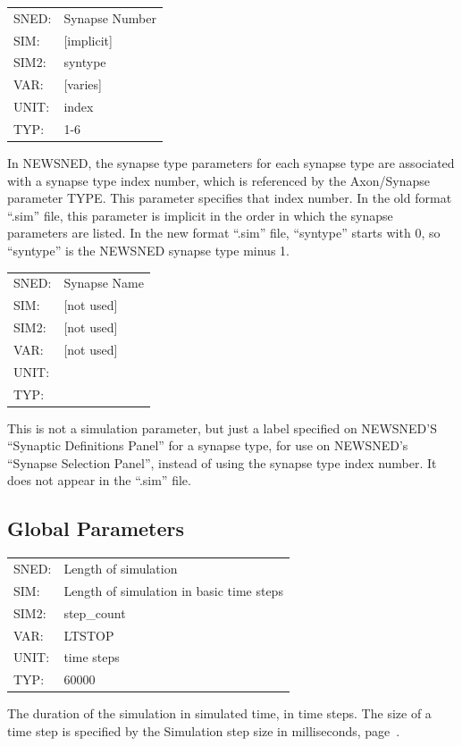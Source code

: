 \documentclass[12pt,openany,oneside]{book}
\newcommand{\tiref}[1]{#1, page~\pageref{#1}}
\begin{document}
\begin{flushleft}
\begin{tabular}{@{}ll@{}}
SNED: & Synapse Number\\
SIM: & [implicit]\\
SIM2: & syntype\\
VAR: & [varies]\\
UNIT: & index\\
TYP: & 1-6\\
\end{tabular}
\end{flushleft}
\noindent
In NEWSNED, the synapse type parameters for each synapse type are
associated with a synapse type index number, which is referenced by
the Axon/Synapse parameter TYPE.  This parameter specifies that index
number.  In the old format ``.sim'' file, this parameter is implicit
in the order in which the synapse parameters are listed.  In the new
format ``.sim'' file, ``syntype'' starts with 0, so ``syntype'' is the
NEWSNED synapse type minus 1.
\filbreak
\vspace{\baselineskip}

\begin{flushleft}
\begin{tabular}{@{}ll@{}}
SNED: & Synapse Name\\
SIM: & [not used]\\
SIM2: & [not used]\\
VAR: & [not used]\\
UNIT: & \\
TYP: &\\
\end{tabular}
\end{flushleft}
\noindent
This is not a simulation parameter, but just a label specified on
NEWSNED'S ``Synaptic Definitions Panel'' for a synapse type, for use
on NEWSNED's ``Synapse Selection Panel'', instead of using the synapse
type index number. It does not appear in the ``.sim'' file.
\filbreak
\vspace{\baselineskip}

\subsection{Global Parameters}
\label{Global Parameters}

\begin{flushleft}
\begin{tabular}{@{}ll@{}}
SNED: & Length of simulation\\
SIM: & Length of simulation in basic time steps\\
SIM2: & step\_count\\
VAR: & LTSTOP\\
UNIT: & time steps\\
TYP: & 60000\\
\end{tabular}
\end{flushleft}
\noindent
The duration of the simulation in simulated time, in time steps.  The
size of a time step is specified by the \tiref{Simulation step size in milliseconds}.
\filbreak
\vspace{\baselineskip}
\end{document}
